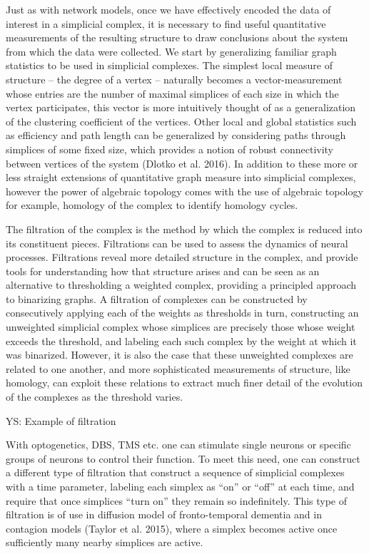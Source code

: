 \documentclass[onecollarge,runningheads]{svjour2}
\begin{document}
Just as with network models, once we have effectively encoded the data of interest in a simplicial complex, it is necessary to find useful quantitative measurements of the resulting structure to draw conclusions about the system from which the data were collected.
We start by generalizing familiar graph statistics to be used in simplicial complexes. The simplest local measure of structure – the degree of a vertex – naturally becomes a vector-measurement whose entries are the number of maximal simplices of each size in which the vertex participates, this vector is more intuitively thought of as a generalization of the clustering coefficient of the vertices. Other local and global statistics such as efficiency and path length can be generalized by considering paths through simplices of some fixed size, which provides a notion of robust connectivity between vertices of the system (Dlotko et al. 2016).
In addition to these more or less straight extensions of quantitative graph measure into simplicial complexes, however the power of algebraic topology comes with the use of algebraic topology for example, homology of the complex to identify homology cycles.

The filtration of the complex is the method by which the complex is reduced into its constituent pieces. Filtrations can be used to assess the dynamics of neural processes. Filtrations reveal more detailed structure in the complex, and provide tools for understanding how that structure arises and can be seen as an alternative to thresholding a weighted complex, providing a principled approach to binarizing graphs.
A filtration of complexes can be constructed by consecutively applying each of the weights as thresholds in turn, constructing an unweighted simplicial complex whose simplices are precisely those whose weight exceeds the threshold, and labeling each such complex by the weight at which it was binarized. However, it is also the case that these unweighted complexes are related to one another, and more sophisticated measurements of structure, like homology, can exploit these relations to extract much finer detail of the evolution of the complexes as the threshold varies.

YS: Example of filtration 

With optogenetics, DBS, TMS etc. one can stimulate single neurons or specific groups of neurons to control their function. To meet this need, one can construct a different type of filtration \cite{taylor2015topological} that construct a sequence of simplicial complexes with a time parameter, labeling each simplex as “on” or “off” at each time, and require that once simplices “turn on” they remain so indefinitely. This type of filtration is of use in  diffusion model of fronto-temporal dementia and in contagion models (Taylor et al. 2015), where a simplex becomes active once sufficiently many nearby simplices are active.
\end{document}
